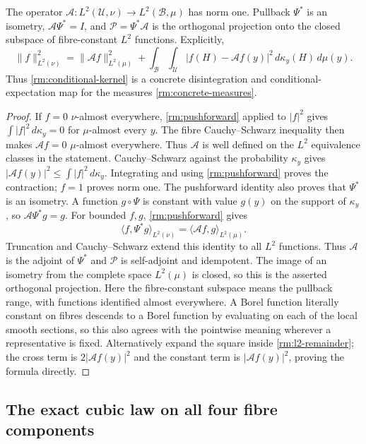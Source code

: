\begin{proposition}\label{rm:hilbert-projection}
The operator $\mathcal A:L^2(\mathcal U,\nu)\to L^2(\mathcal B,\mu)$
has norm one. Pullback $\Psi^*$ is an isometry,
$\mathcal A\Psi^*=I$, and $\mathcal P=\Psi^*\mathcal A$ is the
orthogonal projection onto the closed subspace of fibre-constant
$L^2$ functions. Explicitly,
\begin{equation}\label{rm:l2-remainder}
 \|f\|_{L^2(\nu)}^2
 =\|\mathcal A f\|_{L^2(\mu)}^2
 +\int_{\mathcal B}\int_{\mathcal U}
       |f(H)-\mathcal A f(y)|^2\,d\kappa_y(H)\,d\mu(y).
\end{equation}
Thus \eqref{rm:conditional-kernel} is a concrete disintegration and
conditional-expectation map for the measures \eqref{rm:concrete-measures}.
\end{proposition}
\begin{proof}
If $f=0$ $\nu$-almost everywhere, \eqref{rm:pushforward} applied to
$|f|^2$ gives $\int|f|^2\,d\kappa_y=0$ for $\mu$-almost every $y$.
The fibre Cauchy--Schwarz inequality then makes $\mathcal A f=0$
$\mu$-almost everywhere. Thus $\mathcal A$ is well defined on the
$L^2$ equivalence classes in the statement.
Cauchy--Schwarz against the probability $\kappa_y$ gives
$|\mathcal A f(y)|^2\leq\int|f|^2\,d\kappa_y$. Integrating and
using \eqref{rm:pushforward} proves the contraction; $f=1$ proves norm
one. The pushforward identity also proves that $\Psi^*$ is an
isometry. A function $g\circ\Psi$ is constant with value $g(y)$ on
the support of $\kappa_y$, so $\mathcal A\Psi^*g=g$.
For bounded $f,g$, \eqref{rm:pushforward} gives
\[
 \langle f,\Psi^*g\rangle_{L^2(\nu)}
 =\langle\mathcal A f,g\rangle_{L^2(\mu)}.
\]
Truncation and Cauchy--Schwarz extend this identity to all $L^2$
functions. Thus $\mathcal A$ is the adjoint of $\Psi^*$ and
$\mathcal P$ is self-adjoint and idempotent. The image of an isometry
from the complete space $L^2(\mu)$ is closed, so this is the asserted
orthogonal projection. Here the fibre-constant subspace means the
pullback range, with functions identified almost everywhere. A Borel
function literally constant on fibres descends to a Borel function
by evaluating on each of the local smooth sections, so this also
agrees with the pointwise meaning wherever a representative is fixed.
Alternatively expand the square inside
\eqref{rm:l2-remainder}; the cross term is
$2|\mathcal A f(y)|^2$ and the constant term is
$|\mathcal A f(y)|^2$, proving the formula directly.
\end{proof}

\subsection{The exact cubic law on all four fibre components}

